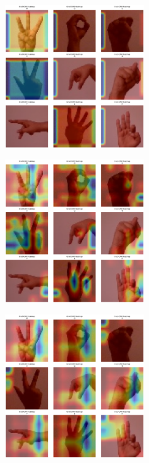 \begin{multicols}{2}
\includegraphics[width=0.45\textwidth]{Assets/gradcam_heatmap/MobileNetV3Large.png}

\vspace{0.8cm}

\includegraphics[width=0.45\textwidth]{Assets/gradcam_heatmap/ResNet50.png}

\vspace{0.8cm}

\includegraphics[width=0.45\textwidth]{Assets/gradcam_heatmap/RESNET101.png}

\vspace{0.8cm}

\newpage


\end{multicols}
